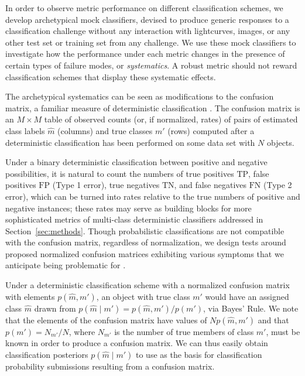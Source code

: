 In order to observe metric performance on different classification schemes, we develop archetypical mock classifiers, devised to produce generic responses to a classification challenge without any interaction with lightcurves, images, or any other test set or training set from any challenge.
We use these mock classifiers to investigate how the performance under each metric changes in the presence of certain types of failure modes, or \textit{systematics}.
A robust metric should not reward classification schemes that display these systematic effects.

The archetypical systematics can be seen as modifications to the confusion matrix, a familiar measure of deterministic classification \citep{bloom_automating_2012}.
The confusion matrix is an $M \times M$ table of observed counts (or, if normalized, rates) of pairs of estimated class labels $\hat{m}$ (columns) and true classes $m'$ (rows) computed after a deterministic classification has been performed on some data set with $N$ objects.

Under a binary deterministic classification between positive and negative possibilities, it is natural to count the numbers of true positives $\mathrm{TP}$, false positives $\mathrm{FP}$ (Type 1 error), true negatives $\mathrm{TN}$, and false negatives $\mathrm{FN}$ (Type 2 error), which can be turned into rates relative to the true numbers of positive and negative instances; these rates may serve as building blocks for more sophisticated metrics of multi-class deterministic classifiers addressed in Section~\ref{sec:methods}.
Though probabilistic classifications are not compatible with the confusion matrix, regardless of normalization, we design tests around proposed normalized confusion matrices exhibiting various symptoms that we anticipate being problematic for \lsst.

Under a deterministic classification scheme with a normalized confusion matrix with elements $p(\hat{m}, m')$, an object with true class $m'$ would have an assigned class $\hat{m}$ drawn from $p(\hat{m} \mid m') = p(\hat{m}, m') / p(m')$, via Bayes' Rule.
We note that the elements of the confusion matrix have values of $N p(\hat{m}, m')$ and that $p(m') = N_{m'} / N$, where $N_{m'}$ is the number of true members of class $m'$, must be known in order to produce a confusion matrix.
We can thus easily obtain classification posteriors $p(\hat{m} \mid m')$ to use as the basis for classification probability submissions resulting from a confusion matrix.

